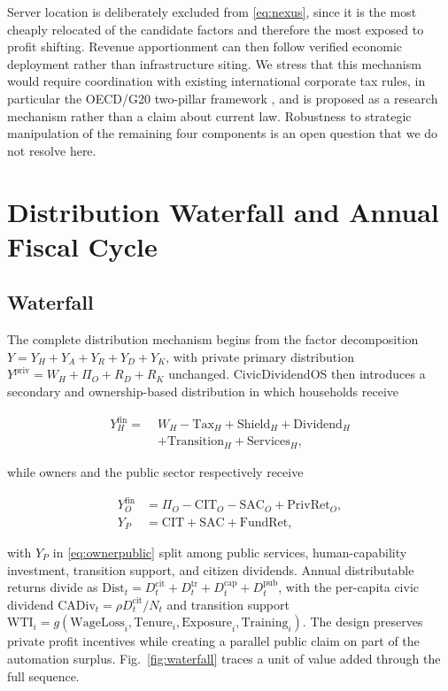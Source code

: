 \documentclass[journal]{IEEEtran}
\theoremstyle{plain}
\theoremstyle{definition}
\newcommand{\SAC}{\mathrm{SAC}}
\begin{document}
Server location is deliberately excluded from \eqref{eq:nexus}, since it is the most cheaply relocated of the candidate factors and therefore the most exposed to profit shifting. Revenue apportionment can then follow verified economic deployment rather than infrastructure siting. We stress that this mechanism would require coordination with existing international corporate tax rules, in particular the OECD/G20 two-pillar framework \cite{OECDTwoPillar2021}, and is proposed as a research mechanism rather than a claim about current law. Robustness to strategic manipulation of the remaining four components is an open question that we do not resolve here.

\section{Distribution Waterfall and Annual Fiscal Cycle}
\label{sec:waterfall}

\subsection{Waterfall}

The complete distribution mechanism begins from the factor decomposition $Y = Y_H + Y_A + Y_R + Y_D + Y_K$, with private primary distribution $Y^{\mathrm{priv}} = W_H + \Pi_{O} + R_D + R_K$ unchanged. CivicDividendOS then introduces a secondary and ownership-based distribution in which households receive

\begin{align}
\label{eq:household}
Y_H^{\mathrm{fin}} =\;& W_H - \mathrm{Tax}_H + \mathrm{Shield}_H + \mathrm{Dividend}_H \nonumber\\
&+ \mathrm{Transition}_H + \mathrm{Services}_H,
\end{align}

while owners and the public sector respectively receive

\begin{align}
\label{eq:ownerpublic}
Y_O^{\mathrm{fin}} &= \Pi_O - \mathrm{CIT}_O - \SAC_O + \mathrm{PrivRet}_O, \nonumber\\
Y_P &= \mathrm{CIT} + \SAC + \mathrm{FundRet},
\end{align}

with $Y_P$ in \eqref{eq:ownerpublic} split among public services, human-capability investment, transition support, and citizen dividends. Annual distributable returns divide as $\mathrm{Dist}_t = D^{\mathrm{cit}}_t + D^{\mathrm{tr}}_t + D^{\mathrm{cap}}_t + D^{\mathrm{pub}}_t$, with the per-capita civic dividend $\mathrm{CADiv}_t = \rho D^{\mathrm{cit}}_t / N_t$ and transition support $\mathrm{WTI}_i = g(\mathrm{WageLoss}_i, \mathrm{Tenure}_i, \mathrm{Exposure}_i, \mathrm{Training}_i)$. The design preserves private profit incentives while creating a parallel public claim on part of the automation surplus. Fig.~\ref{fig:waterfall} traces a unit of value added through the full sequence.
\end{document}

